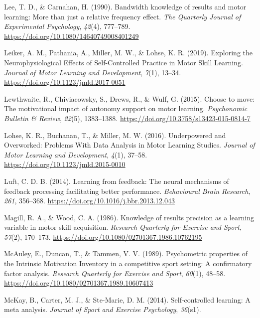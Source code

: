\documentclass[
  man, donotrepeattitle,floatsintext]{apa7}
\newlength{\cslhangindent}
\newlength{\cslentryspacingunit} %
\newenvironment{CSLReferences}[2] %
 {%
  \setlength{\parindent}{0pt}
  \ifodd #1
  \let\oldpar\par
  \def\par{\hangindent=\cslhangindent\oldpar}
  \fi
  \setlength{\parskip}{#2\cslentryspacingunit}
 }%
 {}
\begin{document}
\begin{CSLReferences}{1}{0}
\leavevmode{}%
Lee, T. D., \& Carnahan, H. (1990). Bandwidth knowledge of results and motor learning: More than just a relative frequency effect. \emph{The Quarterly Journal of Experimental Psychology}, \emph{42}(4), 777--789. \url{https://doi.org/10.1080/14640749008401249}

\leavevmode{}%
Leiker, A. M., Pathania, A., Miller, M. W., \& Lohse, K. R. (2019). Exploring the {Neurophysiological} {Effects} of {Self}-{Controlled} {Practice} in {Motor} {Skill} {Learning}. \emph{Journal of Motor Learning and Development}, \emph{7}(1), 13--34. \url{https://doi.org/10.1123/jmld.2017-0051}

\leavevmode{}%
Lewthwaite, R., Chiviacowsky, S., Drews, R., \& Wulf, G. (2015). Choose to move: {The} motivational impact of autonomy support on motor learning. \emph{Psychonomic Bulletin \& Review}, \emph{22}(5), 1383--1388. \url{https://doi.org/10.3758/s13423-015-0814-7}

\leavevmode{}%
Lohse, K. R., Buchanan, T., \& Miller, M. W. (2016). Underpowered and Overworked: Problems With Data Analysis in Motor Learning Studies. \emph{Journal of Motor Learning and Development}, \emph{4}(1), 37--58. \url{https://doi.org/10.1123/jmld.2015-0010}

\leavevmode{}%
Luft, C. D. B. (2014). Learning from feedback: The neural mechanisms of feedback processing facilitating better performance. \emph{Behavioural Brain Research}, \emph{261}, 356--368. \url{https://doi.org/10.1016/j.bbr.2013.12.043}

\leavevmode{}%
Magill, R. A., \& Wood, C. A. (1986). Knowledge of results precision as a learning variable in motor skill acquisition. \emph{Research Quarterly for Exercise and Sport}, \emph{57}(2), 170--173. \url{https://doi.org/10.1080/02701367.1986.10762195}

\leavevmode{}%
McAuley, E., Duncan, T., \& Tammen, V. V. (1989). Psychometric properties of the {Intrinsic} {Motivation} {Inventory} in a competitive sport setting: A confirmatory factor analysis. \emph{Research Quarterly for Exercise and Sport}, \emph{60}(1), 48--58. \url{https://doi.org/10.1080/02701367.1989.10607413}

\leavevmode{}%
McKay, B., Carter, M. J., \& Ste-Marie, D. M. (2014). Self-controlled learning: {A} meta analysis. \emph{Journal of Sport and Exercise Psychology}, \emph{36}(s1).


\end{CSLReferences}
\end{document}
